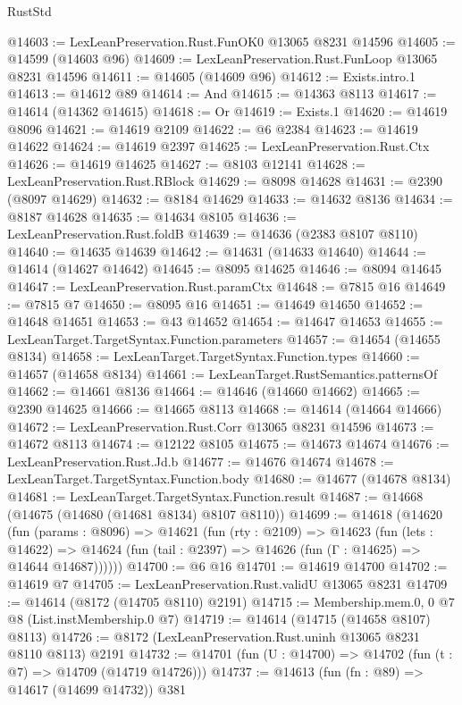 \begin{lexlean}{RustStd}
\begin{coremodule}
@14603 := LexLeanPreservation.Rust.FunOK0 @13065 @8231 @14596
@14605 := @14599 (@14603 @96)
@14609 := LexLeanPreservation.Rust.FunLoop @13065 @8231 @14596
@14611 := @14605 (@14609 @96)
@14612 := Exists.intro.{1}
@14613 := @14612 @89
@14614 := And
@14615 := @14363 @8113
@14617 := @14614 (@14362 @14615)
@14618 := Or
@14619 := Exists.{1}
@14620 := @14619 @8096
@14621 := @14619 @2109
@14622 := @6 @2384
@14623 := @14619 @14622
@14624 := @14619 @2397
@14625 := LexLeanPreservation.Rust.Ctx
@14626 := @14619 @14625
@14627 := @8103 @12141
@14628 := LexLeanPreservation.Rust.RBlock
@14629 := @8098 @14628
@14631 := @2390 (@8097 @14629)
@14632 := @8184 @14629
@14633 := @14632 @8136
@14634 := @8187 @14628
@14635 := @14634 @8105
@14636 := LexLeanPreservation.Rust.foldB
@14639 := @14636 (@2383 @8107 @8110)
@14640 := @14635 @14639
@14642 := @14631 (@14633 @14640)
@14644 := @14614 (@14627 @14642)
@14645 := @8095 @14625
@14646 := @8094 @14645
@14647 := LexLeanPreservation.Rust.paramCtx
@14648 := @7815 @16
@14649 := @7815 @7
@14650 := @8095 @16
@14651 := @14649 @14650
@14652 := @14648 @14651
@14653 := @43 @14652
@14654 := @14647 @14653
@14655 := LexLeanTarget.TargetSyntax.Function.parameters
@14657 := @14654 (@14655 @8134)
@14658 := LexLeanTarget.TargetSyntax.Function.types
@14660 := @14657 (@14658 @8134)
@14661 := LexLeanTarget.RustSemantics.patternsOf
@14662 := @14661 @8136
@14664 := @14646 (@14660 @14662)
@14665 := @2390 @14625
@14666 := @14665 @8113
@14668 := @14614 (@14664 @14666)
@14672 := LexLeanPreservation.Rust.Corr @13065 @8231 @14596
@14673 := @14672 @8113
@14674 := @12122 @8105
@14675 := @14673 @14674
@14676 := LexLeanPreservation.Rust.Jd.b
@14677 := @14676 @14674
@14678 := LexLeanTarget.TargetSyntax.Function.body
@14680 := @14677 (@14678 @8134)
@14681 := LexLeanTarget.TargetSyntax.Function.result
@14687 := @14668 (@14675 (@14680 (@14681 @8134) @8107 @8110))
@14699 := @14618
    (@14620
      (fun (params : @8096) =>
      @14621
        (fun (rty : @2109) =>
        @14623
          (fun (lets : @14622) =>
          @14624 (fun (tail : @2397) => @14626 (fun (Γ : @14625) => @14644 @14687))))))
@14700 := @6 @16
@14701 := @14619 @14700
@14702 := @14619 @7
@14705 := LexLeanPreservation.Rust.validU @13065 @8231
@14709 := @14614 (@8172 (@14705 @8110) @2191)
@14715 := Membership.mem.{0, 0} @7 @8 (List.instMembership.{0} @7)
@14719 := @14614 (@14715 (@14658 @8107) @8113)
@14726 := @8172 (LexLeanPreservation.Rust.uninh @13065 @8231 @8110 @8113) @2191
@14732 := @14701 (fun (U : @14700) => @14702 (fun (t : @7) => @14709 (@14719 @14726)))
@14737 := @14613 (fun (fn : @89) => @14617 (@14699 @14732)) @381

\end{coremodule}
\end{lexlean}
